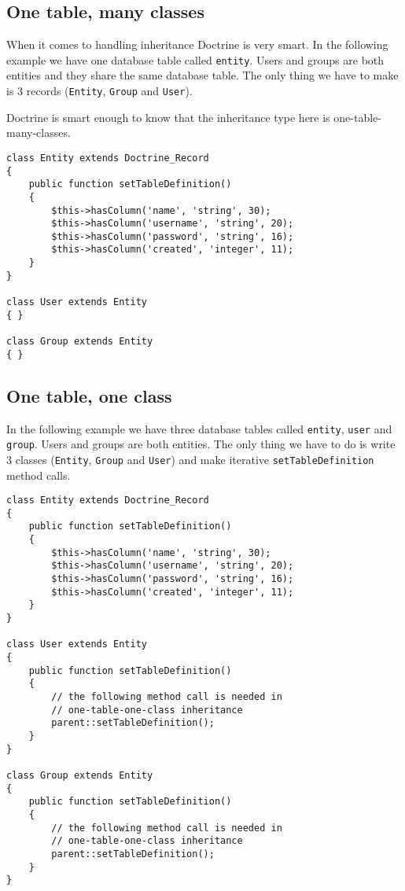 \documentclass[11pt,a4paper]{report}
\begin{document}
\subsection{One table, many classes}
When it comes to handling inheritance Doctrine is very smart. In the following example we have one database table called \texttt{entity}. Users and groups are both entities and they share the same database table. The only thing we have to make is 3 records (\texttt{Entity}, \texttt{Group} and \texttt{User}).

Doctrine is smart enough to know that the inheritance type here is one-table-many-classes.

\begin{verbatim}
class Entity extends Doctrine_Record
{
    public function setTableDefinition()
    {
        $this->hasColumn('name', 'string', 30);
        $this->hasColumn('username', 'string', 20);
        $this->hasColumn('password', 'string', 16);
        $this->hasColumn('created', 'integer', 11);
    }
}

class User extends Entity
{ }

class Group extends Entity
{ }
\end{verbatim}

\subsection{One table, one class}
In the following example we have three database tables called \texttt{entity}, \texttt{user} and \texttt{group}. Users and groups are both entities. The only thing we have to do is write 3 classes (\texttt{Entity}, \texttt{Group} and \texttt{User}) and make iterative \texttt{setTableDefinition} method calls.

\begin{verbatim}
class Entity extends Doctrine_Record
{
    public function setTableDefinition()
    {
        $this->hasColumn('name', 'string', 30);
        $this->hasColumn('username', 'string', 20);
        $this->hasColumn('password', 'string', 16);
        $this->hasColumn('created', 'integer', 11);
    }
}

class User extends Entity
{
    public function setTableDefinition()
    {
        // the following method call is needed in
        // one-table-one-class inheritance
        parent::setTableDefinition();
    }
}

class Group extends Entity
{
    public function setTableDefinition()
    {
        // the following method call is needed in
        // one-table-one-class inheritance
        parent::setTableDefinition();
    }
}
\end{verbatim}
\end{document}
